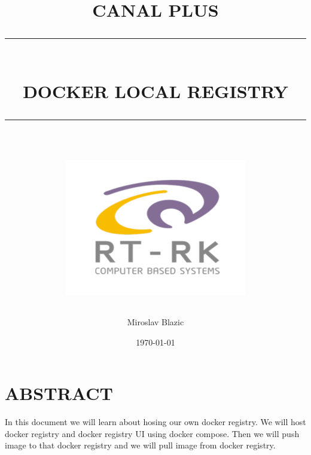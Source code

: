 \documentclass[12pt]{report}
\begin{document}
\newcommand{\HRule}[1]{\rule{\linewidth}{#1}}
\onehalfspacing


\pagestyle{fancy}
\fancyhf{}
\setlength\headheight{15pt}


\title{ \normalsize \textsc{CANAL PLUS}
\\ [1.0cm]
\HRule{0.5pt} \\
\LARGE \textbf{\uppercase{DOCKER LOCAL REGISTRY}}
\HRule{2pt} \\ [0.5cm]
\normalsize  \vspace*{5\baselineskip}
\includegraphics[scale=0.8]{logo_rtrk.png}
}



\author{Miroslav Blazic}
\date{\today\\
}

\maketitle



\newpage
\tableofcontents
\newpage




\section*{ABSTRACT}
In this document we will learn about hosing our own docker registry. We will host docker registry and docker registry UI using docker compose.
Then we will push image to that docker registry and we will pull image from docker registry.
\newpage
\end{document}
